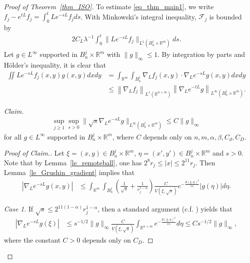 \documentclass[12pt]{amsart}
\theoremstyle{plain}
\theoremstyle{definition}
\numberwithin{equation}{section}
\begin{document}
\begin{proof}[Proof of Theorem~\ref{thm_ISO}]
To estimate \eqref{eq_thm_main1}, we write $f_j - e^{tL}f_j = \int_0^t L e^{-sL}f_j ds$. With Minkowski's integral inequality, $\mathcal{F}_j$ is bounded by
\begin{align}\label{eq_thm_main2}
    2C_L\lambda^{-1} \int_0^t \|L e^{-sL} f_j \|_{L^1(B_n^{j} \times \mathbb{R}^m)} ds.
\end{align}
Let $g\in L^\infty$ supported in $B_n^{j} \times \mathbb{R}^m$ with $\|g\|_{\infty} \le 1$. By integration by parts and Hölder's inequality, it is clear that
\begin{align}\label{eq_thm_main3}
    \iint L e^{-sL} f_j(x,y) g(x,y) dx dy &= \int_{\mathbb{R}^m}\int_{B_n^{j}} \nabla_L f_j(x,y) \cdot \nabla_L e^{-sL}g(x,y) dx dy\\ \nonumber
    &\le \left\| \nabla_L f_j \right\|_{L^1(\mathbb{R}^{n+m})} \left\| \nabla_L e^{-tL}g\right\|_{L^\infty(B_n^{j}\times \mathbb{R}^m)}.
\end{align}

\medskip

\textit{Claim.}
\begin{align}\label{claim}
    \sup_{j \ge 1} \sup_{s>0} \|\sqrt{s} \nabla_L e^{-sL}g \|_{L^\infty(B_n^{j}\times \mathbb{R}^m)} \le  C\|g\|_\infty
\end{align}
for all $g\in L^\infty$ supported in $B_n^{j} \times \mathbb{R}^m$, where $C$ depends only on $n,m,\alpha,\beta,C_d,C_D$.

\begin{proof}[Proof of \textit{Claim.}]

Let $\xi = (x,y)\in B_n^j \times\mathbb{R}^m$, $\eta=(x',y') \in B_n^j \times\mathbb{R}^m$ and $s>0$. Note that by Lemma~\ref{le_remoteball}, one has $2^8 r_j \le |x| \le 2^{11} r_j$. Then Lemma~\ref{le_Grushin_gradient} implies that
\begin{align*}
    \left|\nabla_L e^{-sL}g(x,y)\right| &\le \int_{\mathbb{R}^m} \int_{B_n^j} \left(\frac{1}{\sqrt{s}} + \frac{1}{r_j^{1-\alpha}}\right) \frac{C}{V(\xi,\sqrt{s})} e^{-\frac{d(\xi,\eta)^2}{cs}} |g(\eta)| d\eta.
\end{align*}

\textit{Case 1.} If $\sqrt{s}\le 2^{11(1-\alpha)}r_j^{1-\alpha}$, then a standard argument (c.f. \cite[Lemma 2.1]{CD2}) yields that
\begin{align*}
\left|\nabla_L e^{-sL}g(\xi)\right| &\le s^{-1/2} \|g\|_\infty \frac{C}{V(\xi,\sqrt{s})} \int_{\mathbb{R}^{n+m}} e^{-\frac{d(\xi,\eta)^2}{cs}}d\eta \le C s^{-1/2} \|g\|_\infty,
\end{align*}
where the constant $C>0$ depends only on $C_D$.


\end{proof}
\end{proof}
\end{document}
